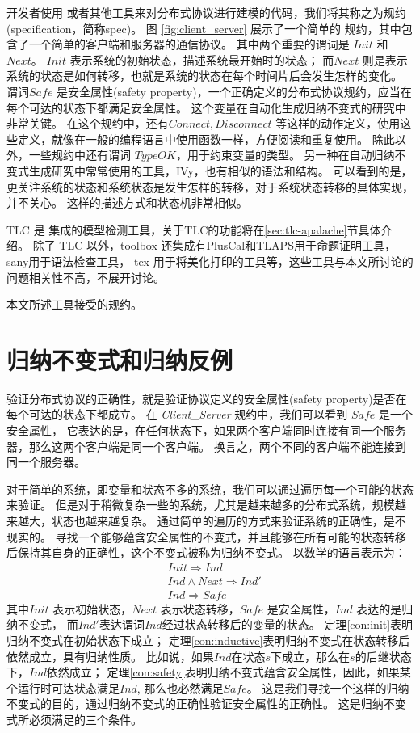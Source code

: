 开发者使用 \TLA 或者其他工具来对分布式协议进行建模的代码，我们将其称之为规约(specification，简称spec)。
图 \ref{fig:client_server} 展示了一个简单的 \TLA 规约，其中包含了一个简单的客户端和服务器的通信协议。
其中两个重要的谓词是 $Init$ 和 $Next$。
$Init$ 表示系统的初始状态，描述系统最开始时的状态；
而$Next$ 则是表示系统的状态是如何转移，也就是系统的状态在每个时间片后会发生怎样的变化。
谓词$Safe$ 是安全属性(safety property)，一个正确定义的分布式协议规约，应当在每个可达的状态下都满足安全属性。
这个变量在自动化生成归纳不变式的研究中非常关键。
在这个规约中，还有$Connect, Disconnect$ 等这样的动作定义，使用这些定义，就像在一般的编程语言中使用函数一样，方便阅读和重复使用。
除此以外，一些规约中还有谓词 $TypeOK$，用于约束变量的类型。
另一种在自动归纳不变式生成研究中常常使用的工具，IVy，也有相似的语法和结构。
可以看到的是，\TLA 更关注系统的状态和系统状态是发生怎样的转移，对于系统状态转移的具体实现，\TLA 并不关心。
这样的描述方式和状态机非常相似。

TLC 是 \TLA 集成的模型检测工具，关于TLC的功能将在\ref{sec:tlc-apalache}节具体介绍。
除了 TLC 以外，\TLA toolbox\cite{tla+toolbox} 还集成有PlusCal\cite{PlusCal}和TLAPS用于命题证明工具，sany用于语法检查工具，
tex 用于将\TLA 美化打印的工具等，这些工具与本文所讨论的问题相关性不高，不展开讨论。

本文所述工具接受\TLA 的规约。

\section{归纳不变式和归纳反例}
验证分布式协议的正确性，就是验证协议定义的安全属性(safety property)是否在每个可达的状态下都成立。
在 \textit{Client\_Server} 规约中，我们可以看到 $Safe$ 是一个安全属性，
它表达的是，在任何状态下，如果两个客户端同时连接有同一个服务器，那么这两个客户端是同一个客户端。
换言之，两个不同的客户端不能连接到同一个服务器。

对于简单的系统，即变量和状态不多的系统，我们可以通过遍历每一个可能的状态来验证。
但是对于稍微复杂一些的系统，尤其是越来越多的分布式系统，规模越来越大，状态也越来越复杂。
通过简单的遍历的方式来验证系统的正确性，是不现实的。
寻找一个能够蕴含安全属性的不变式，并且能够在所有可能的状态转移后保持其自身的正确性，这个不变式被称为归纳不变式。
以数学的语言表示为：
\begin{align}
    &Init \Rightarrow Ind \label{con:init}\\
    &Ind \land Next \Rightarrow Ind' \label{con:inductive}\\
    &Ind \Rightarrow Safe \label{con:safety}
\end{align}
其中$Init$ 表示初始状态，$Next$ 表示状态转移，$Safe$ 是安全属性，$Ind$ 表达的是归纳不变式，
而$Ind'$表达谓词$Ind$经过状态转移后的变量的状态。
定理\ref{con:init}表明归纳不变式在初始状态下成立；
定理\ref{con:inductive}表明归纳不变式在状态转移后依然成立，具有归纳性质。
比如说，如果$Ind$在状态$s$下成立，那么在$s$的后继状态下，$Ind$依然成立；
定理\ref{con:safety}表明归纳不变式蕴含安全属性，因此，如果某个运行时可达状态满足$Ind$, 那么也必然满足$Safe$。
这是我们寻找一个这样的归纳不变式的目的，通过归纳不变式的正确性验证安全属性的正确性。
这是归纳不变式所必须满足的三个条件。

